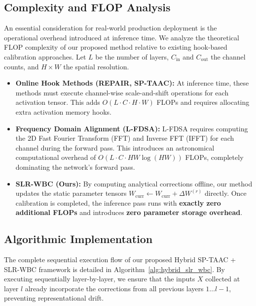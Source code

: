 \documentclass{article}
\theoremstyle{plain}
\theoremstyle{definition}
\theoremstyle{remark}
\begin{document}
\subsection{Complexity and FLOP Analysis}
An essential consideration for real-world production deployment is the operational overhead introduced at inference time. We analyze the theoretical FLOP complexity of our proposed method relative to existing hook-based calibration approaches. Let $L$ be the number of layers, $C_{\text{in}}$ and $C_{\text{out}}$ the channel counts, and $H \times W$ the spatial resolution.
\begin{itemize}
  \item \textbf{Online Hook Methods (REPAIR, SP-TAAC):} At inference time, these methods must execute channel-wise scale-and-shift operations for each activation tensor. This adds $O(L \cdot C \cdot H \cdot W)$ FLOPs and requires allocating extra activation memory hooks.
  \item \textbf{Frequency Domain Alignment (L-FDSA):} L-FDSA requires computing the 2D Fast Fourier Transform (FFT) and Inverse FFT (IFFT) for each channel during the forward pass. This introduces an astronomical computational overhead of $O(L \cdot C \cdot H W \log(H W))$ FLOPs, completely dominating the network's forward pass.
  \item \textbf{SLR-WBC (Ours):} By computing analytical corrections offline, our method updates the static parameter tensors $W_{\text{curr}} \leftarrow W_{\text{curr}} + \Delta W^{(r)}$ directly. Once calibration is completed, the inference pass runs with \textbf{exactly zero additional FLOPs} and introduces \textbf{zero parameter storage overhead}.
\end{itemize}

\subsection{Algorithmic Implementation}
The complete sequential execution flow of our proposed Hybrid SP-TAAC + SLR-WBC framework is detailed in Algorithm~\ref{alg:hybrid_slr_wbc}. By executing sequentially layer-by-layer, we ensure that the inputs $X$ collected at layer $l$ already incorporate the corrections from all previous layers $1 \dots l-1$, preventing representational drift.
\end{document}
